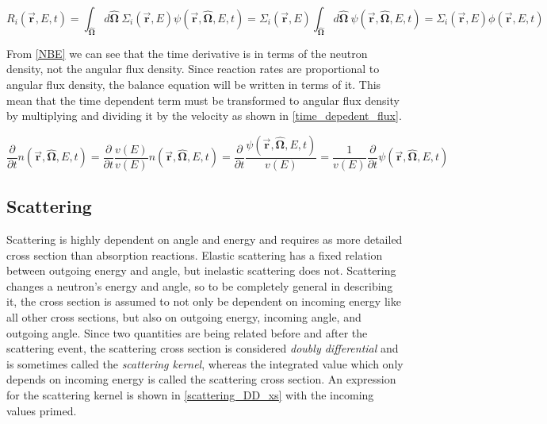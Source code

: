 \begin{equation}
\label{scalar_flux_RR}
 R_i(\boldsymbol{\vec{r}},E,t) = \int_{\boldsymbol{\hat{\Omega}}} d\boldsymbol{\hat{\Omega}} \: \Sigma_i(\boldsymbol{\vec{r}},E) \psi(\boldsymbol{\vec{r}},\boldsymbol{\hat{\Omega}},E,t) = \Sigma_i(\boldsymbol{\vec{r}},E) \int_{\boldsymbol{\hat{\Omega}}} d\boldsymbol{\hat{\Omega}} \: \psi(\boldsymbol{\vec{r}},\boldsymbol{\hat{\Omega}},E,t) = \Sigma_i(\boldsymbol{\vec{r}},E) \phi(\boldsymbol{\vec{r}},E,t)
 \end{equation}
 
 From \eqref{NBE} we can see that the time derivative is in terms of the neutron density, not the angular flux density.  Since reaction rates are proportional to angular flux density, the balance equation will be written in terms of it.  This mean that the time dependent term must be transformed to angular flux density by multiplying and dividing it by the velocity as shown in \eqref{time_depedent_flux}.

\begin{equation}
\label{time_depedent_flux}
\frac{\partial }{\partial t}n(\boldsymbol{\vec{r}},\boldsymbol{\hat{\Omega}},E,t) = \frac{\partial }{\partial t}  \frac{v(E)}{v(E)} n(\boldsymbol{\vec{r}},\boldsymbol{\hat{\Omega}},E,t) =  \frac{\partial }{\partial t}  \frac{\psi(\boldsymbol{\vec{r}},\boldsymbol{\hat{\Omega}},E,t)}{v(E)} = \frac{1}{v(E)} \frac{\partial }{\partial t}\psi(\boldsymbol{\vec{r}},\boldsymbol{\hat{\Omega}},E,t)
\end{equation}

\subsection{Scattering}

Scattering is highly dependent on angle and energy and requires as more detailed cross section than absorption reactions.  Elastic scattering has a fixed relation between outgoing energy and angle, but inelastic scattering does not.  Scattering changes a neutron's energy and angle, so to be completely general in describing it, the cross section is assumed to not only be dependent on incoming energy like all other cross sections, but also on outgoing energy, incoming angle, and outgoing angle.  Since two quantities are being related before and after the scattering event, the scattering cross section is considered \emph{doubly differential} and is sometimes called the \emph{scattering kernel}, whereas the integrated value which only depends on incoming energy is called the scattering cross section.   An expression for the scattering kernel is shown in \eqref{scattering_DD_xs} with the incoming values primed.

